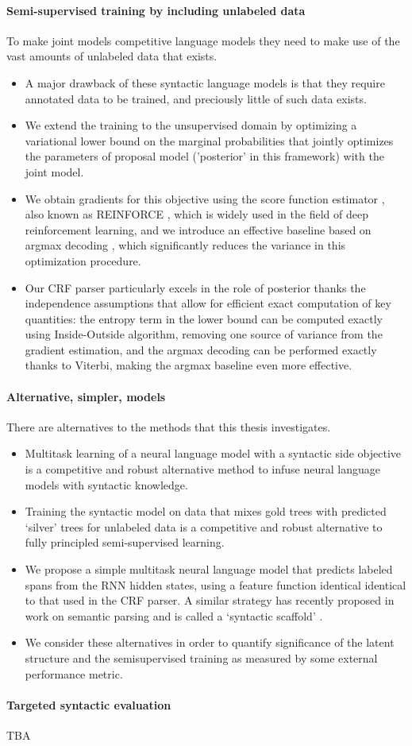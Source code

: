 \paragraph{Semi-supervised training by including unlabeled data} To make joint models competitive language models they need to make use of the vast amounts of unlabeled data that exists.
\begin{itemize}
  \item A major drawback of these syntactic language models is that they require annotated data to be trained, and preciously little of such data exists.
  \item We extend the training to the unsupervised domain by optimizing a variational lower bound on the marginal probabilities that jointly optimizes the parameters of proposal model ('posterior' in this framework) with the joint model.
  \item We obtain gradients for this objective using the score function estimator \citep{Fu2006}, also known as REINFORCE \citep{Williams1992:REINFORCE}, which is widely used in the field of deep reinforcement learning, and we introduce an effective baseline based on argmax decoding \citep{Rennie+2017:argmax-baseline}, which significantly reduces the variance in this optimization procedure.
  \item Our CRF parser particularly excels in the role of posterior thanks the independence assumptions that allow for efficient exact computation of key quantities: the entropy term in the lower bound can be computed exactly using Inside-Outside algorithm, removing one source of variance from the gradient estimation, and the argmax decoding can be performed exactly thanks to Viterbi, making the argmax baseline even more effective.
\end{itemize}

\paragraph{Alternative, simpler, models} There are alternatives to the methods that this thesis investigates.
\begin{itemize}
  \item Multitask learning of a neural language model with a syntactic side objective is a competitive and robust alternative method to infuse neural language models with syntactic knowledge.
  \item Training the syntactic model on data that mixes gold trees with predicted `silver' trees for unlabeled data is a competitive and robust alternative to fully principled semi-supervised learning.
  \item We propose a simple multitask neural language model that predicts labeled spans from the RNN hidden states, using a feature function identical identical to that used in the CRF parser. A similar strategy has recently proposed in work on semantic parsing and is called a `syntactic scaffold' \citep{Swayamdipta+2018:scaffold}.
  \item We consider these alternatives in order to quantify significance of the latent structure and the semisupervised training as measured by some external performance metric.
\end{itemize}

\paragraph{Targeted syntactic evaluation}
TBA
